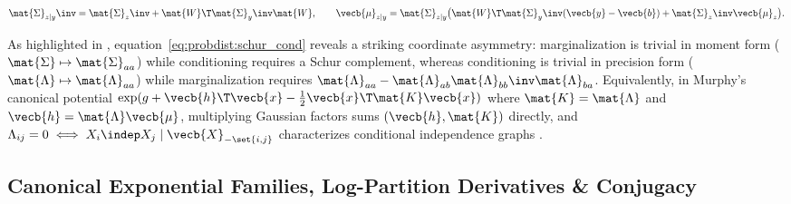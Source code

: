 \documentclass[../../../../master.tex]{subfiles}
\begin{document}
\begin{coremath}
\begin{equation}\label{eq:probdist:linear_gaussian_bayes}
  \mat{\Sigma}_{z\mid y}\inv = \mat{\Sigma}_z\inv + \mat{W}\T \mat{\Sigma}_y\inv \mat{W}, \qquad
  \vecb{\mu}_{z\mid y} = \mat{\Sigma}_{z\mid y}\bigl(\mat{W}\T \mat{\Sigma}_y\inv(\vecb{y}-\vecb{b}) + \mat{\Sigma}_z\inv \vecb{\mu}_z\bigr).
\end{equation}
\end{coremath}


\begin{intuition}
As highlighted in , equation~\eqref{eq:probdist:schur_cond} reveals a striking coordinate asymmetry: marginalization is trivial in moment form ($\mat{\Sigma} \mapsto \mat{\Sigma}_{aa}$) while conditioning requires a Schur complement, whereas conditioning is trivial in precision form ($\mat{\Lambda} \mapsto \mat{\Lambda}_{aa}$) while marginalization requires $\mat{\Lambda}_{aa} - \mat{\Lambda}_{ab}\mat{\Lambda}_{bb}\inv\mat{\Lambda}_{ba}$. Equivalently, in Murphy's canonical potential $\exp(g + \vecb{h}\T\vecb{x} - \tfrac{1}{2}\vecb{x}\T\mat{K}\vecb{x})$ where $\mat{K}=\mat{\Lambda}$ and $\vecb{h}=\mat{\Lambda}\vecb{\mu}$, multiplying Gaussian factors sums $(\vecb{h}, \mat{K})$ directly, and $\Lambda_{ij} = 0 \iff X_i \indep X_j \mid \vecb{X}_{-\set{i,j}}$ characterizes conditional independence graphs .
\end{intuition}

\subsection{Canonical Exponential Families, Log-Partition Derivatives \& Conjugacy}
\end{document}
